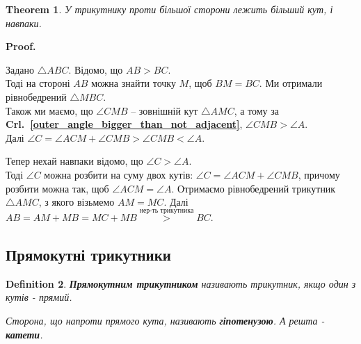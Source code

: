 \documentclass[a4paper, 10pt]{article}
\makeatletter
\theoremstyle{theoremdd}
\newtheorem{theorem}{Theorem}[subsection]
\theoremstyle{theoremdd}
\theoremstyle{theoremdd}
\newtheorem{definition}[theorem]{Definition}
\theoremstyle{theoremdd}
\theoremstyle{theoremdd}
\theoremstyle{theoremdd}
\theoremstyle{theoremdd}
\theoremstyle{theoremdd}
\theoremstyle{theoremdd}
\newcommand\crlref[1]{\textbf{Crl.~\ref{#1}}}
\renewenvironment{proof}[1][Proof.\\]{\par
\pushQED{\hfill \qed}%
\normalfont \topsep6\p@\@plus6\p@\relax
\trivlist
\item\relax
{\bfseries
#1\@addpunct{.}}\hspace\labelsep\ignorespaces
}{%
\popQED\endtrivlist\@endpefalse
}
\makeatother
\begin{document}
\begin{theorem}
У трикутнику проти більшої сторони лежить більший кут, і навпаки.
\end{theorem}

\begin{proof}
Задано $\triangle ABC$. Відомо, що $AB > BC$.\\
Тоді на стороні $AB$ можна знайти точку $M$, щоб $BM = BC$. Ми отримали рівнобедрений $\triangle MBC$.\\
Також ми маємо, що $\angle CMB$ -- зовнішній кут $\triangle AMC$, а тому за \crlref{outer_angle_bigger_than_not_adjacent}, $\angle CMB > \angle A$.\\
Далі $\angle C = \angle ACM + \angle CMB > \angle CMB < \angle A$.
\begin{figure}[H]
\centering
{}
\end{figure}
Тепер нехай навпаки відомо, що $\angle C > \angle A$.\\
Тоді $\angle C$ можна розбити на суму двох кутів: $\angle C = \angle ACM + \angle CMB$, причому розбити можна так, щоб $\angle ACM = \angle A$. Отримаємо рівнобедрений трикутник $\triangle AMC$, з якого візьмемо $AM = MC$. Далі $AB = AM + MB = MC + MB \overset{\text{нер-ть трикутника}}{>} BC$.
\end{proof}

\subsection{Прямокутні трикутники}
\begin{definition}
\textbf{Прямокутним трикутником} називають трикутник, якщо один з кутів - прямий.
\begin{figure}[H]
\centering
{}
\end{figure}
Сторона, що напроти прямого кута, називають \textbf{гіпотенузою}. А решта - \textbf{катети}.
\end{definition}
\end{document}
